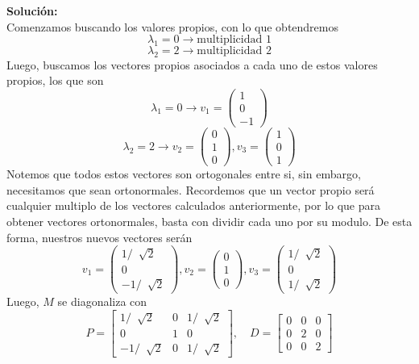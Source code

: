 \documentclass[12pt]{article}
\newenvironment{solucion}
{\begin{mdframed}[backgroundcolor=black!10]
		{\bf Solución:}\\
	}
	{
	\end{mdframed}
}
\newenvironment{preguntas}
{\begin{enumerate}\itemsep12pt
	}
	{
	\end{enumerate}
}
\newcommand{\ra}{\rightarrow}
\begin{document}
\begin{preguntas}
\begin{solucion}
		Comenzamos buscando los valores propios, con lo que obtendremos
		$$\lambda_1 = 0 \ra \text{multiplicidad 1}$$
		$$\lambda_2 = 2 \ra \text{multiplicidad 2}$$
		Luego, buscamos los vectores propios asociados a cada uno de estos valores propios, los que son
		$$\lambda_1 = 0 \ra v_1 = \begin{pmatrix}
		1 \\ 0 \\ -1
		\end{pmatrix}$$
		$$\lambda_2 = 2 \ra v_2 = \begin{pmatrix}
		0 \\ 1 \\ 0
		\end{pmatrix}, v_3 = \begin{pmatrix}
		1 \\ 0 \\ 1
		\end{pmatrix}$$
		Notemos que todos estos vectores son ortogonales entre si, sin embargo, necesitamos que sean ortonormales. Recordemos que un vector propio será cualquier multiplo de los vectores calculados anteriormente, por lo que para obtener vectores ortonormales, basta con dividir cada uno por su modulo. De esta forma, nuestros nuevos vectores serán
		$$v_1 = \begin{pmatrix}
		1/\ \sqrt[]{2} \\ 0 \\ -1/\ \sqrt[]{2}
		\end{pmatrix}, v_2 = \begin{pmatrix}
		0 \\ 1 \\ 0
		\end{pmatrix}, v_3 = \begin{pmatrix}
		1/\ \sqrt[]{2} \\ 0 \\ 1/\ \sqrt[]{2}
		\end{pmatrix}$$
		Luego, $M$ se diagonaliza con
		$$P = \begin{bmatrix}
		1/\ \sqrt[]{2} & 0 & 1/\ \sqrt[]{2} \\
		0 & 1 & 0 \\
		-1/\ \sqrt[]{2} & 0 & 1/\ \sqrt[]{2}
		\end{bmatrix}, \quad D = \begin{bmatrix}
		0 & 0 & 0 \\
		0 & 2 & 0 \\
		0 & 0 & 2
		\end{bmatrix}$$
\end{solucion}

\end{preguntas}
\end{document}
